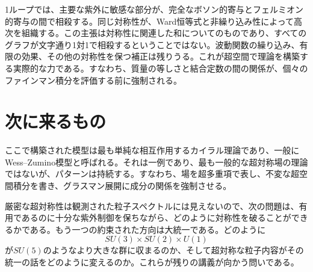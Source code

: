 1ループでは、主要な紫外に敏感な部分が、完全なボソン的寄与とフェルミオン的寄与の間で相殺する。同じ対称性が、Ward恒等式と非繰り込み性によって高次を組織する。この主張は対称性に関連した和についてのものであり、すべてのグラフが文字通り1対1で相殺するということではない。波動関数の繰り込み、有限の効果、その他の対称性を保つ補正は残りうる。これが超空間で理論を構築する実際的な力である。すなわち、質量の等しさと結合定数の間の関係が、個々のファインマン積分を評価する前に強制される。

\section{次に来るもの}

ここで構築された模型は最も単純な相互作用するカイラル理論であり、一般にWess--Zumino模型と呼ばれる。それは一例であり、最も一般的な超対称場の理論ではないが、パターンは持続する。すなわち、場を超多重項で表し、不変な超空間積分を書き、グラスマン展開に成分の関係を強制させる。

厳密な超対称性は観測された粒子スペクトルには見えないので、次の問題は、有用であるのに十分な紫外制御を保ちながら、どのように対称性を破ることができるかである。もう一つの約束された方向は大統一である。どのように
\begin{equation}
SU(3)\times SU(2)\times U(1)
\end{equation}
が\(SU(5)\)のようなより大きな群に収まるのか、そして超対称な粒子内容がその統一の話をどのように変えるのか。これらが残りの講義が向かう問いである。
